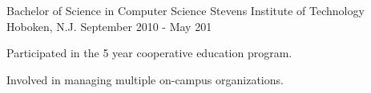 

\begin{cventries}

  \cventry
    {Bachelor of Science in Computer Science} %
    {Stevens Institute of Technology} %
    {Hoboken, N.J.} %
    {September 2010 - May 201} %
    {
      \begin{cvitems} %
        \item {Participated in the 5 year cooperative education program.}
        \item {Involved in managing multiple on-campus organizations.}
      \end{cvitems}
    }

\end{cventries}
